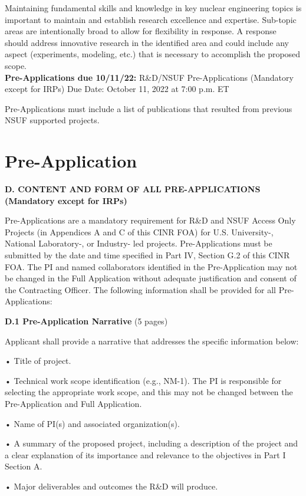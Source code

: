 Maintaining fundamental skills and knowledge in key nuclear engineering topics
is important to maintain and establish research excellence and expertise.
Sub-topic areas are intentionally broad to allow for flexibility in response. A
response should address innovative research in the identified area and could
include any aspect (experiments, modeling, etc.) that is necessary to
accomplish the proposed scope.
\\

{\bf Pre-Applications due 10/11/22:}
R\&D/NSUF Pre-Applications (Mandatory except for IRPs) Due Date: October 11, 2022 at 7:00 p.m. ET


Pre-Applications must include a list of publications
that resulted from previous NSUF supported projects.


\section{Pre-Application}


{\bf D. CONTENT AND FORM OF ALL PRE-APPLICATIONS (Mandatory except for IRPs)}

Pre-Applications are a mandatory requirement for R\&D and NSUF Access Only
Projects (in Appendices A and C of this CINR FOA) for U.S. University-,
National Laboratory-, or Industry- led projects. Pre-Applications must be
submitted by the date and time specified in Part IV, Section G.2 of this CINR
FOA.  The PI and named collaborators identified in the Pre-Application may not
be changed in the Full Application without adequate justification and consent
of the Contracting Officer.  The following information shall be provided for
all Pre-Applications:

{\bf D.1 Pre-Application Narrative} (5 pages)

Applicant shall provide a narrative that addresses the specific information below:

• Title of project.

• Technical work scope identification (e.g., NM-1). The PI is responsible for
selecting the appropriate work scope, and this may not be changed between the
Pre-Application and Full Application.

• Name of PI(s) and associated organization(s).

• A summary of the proposed project, including a description of the project and
a clear explanation of its importance and relevance to the objectives in Part I
Section A.

• Major deliverables and outcomes the R\&D will produce.

